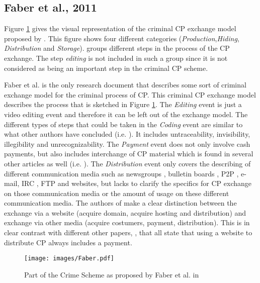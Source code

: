 \documentclass{sig-alternate-br}
\begin{document}
\subsection{Faber et al., 2011 \cite{en2011phishing}}
Figure \ref{fig:faber_01} gives the visual representation of the criminal CP exchange model proposed by \cite{en2011phishing}. This figure shows four different categories (\textit{Production},\textit{Hiding}, \textit{Distribution} and \textit{Storage}). \cite{en2011phishing} groups different steps in the process of the CP exchange. The step \textit{editing} is not included in such a group since it is not considered as being an important step in the criminal CP scheme.

Faber et al. \cite{en2011phishing} is the only research document that describes some sort of criminal exchange model for the criminal process of CP. This criminal CP exchange model \cite{en2011phishing} describes the process that is sketched in Figure \ref{fig:faber_01}. The \textit{Editing} event is just a video editing event and therefore it can be left out of the exchange model. The different types of steps that could be taken in the \textit{Coding} event are similar to what other authors have concluded (i.e. \cite{wortley2006child, jenkins2001beyond,wolak2005child}). It includes untraceability, invisibility, illegibility and unrecognizability. The \textit{Payment} event does not only involve cash payments, but also includes interchange of CP material which is found in several other articles as well (i.e. \cite{wortley2006child,wijk2009achter,wolak2005child}). The \textit{Distribution} event only covers the describing of different communication media such as newsgroups \cite{site:usenet}, bulletin boards \cite{site:bulletin}, P2P \cite{site:p2p}, e-mail, IRC \cite{site:IRC}, FTP \cite{site:FTP} and websites, but lacks to clarify the specifics for CP exchange on those communication media or the amount of usage on these different communication media. The authors of \cite{en2011phishing} make a clear distinction between the exchange via a website (acquire domain, acquire hosting and distribution) and exchange via other media (acquire costumers, payment, distribution). This is in clear contrast with different other papers, \cite{wortley2006child,wijk2009achter,callanan2009internet}, that all state that using a website to distribute CP always includes a payment.

\begin{figure}[ht]
\centering
\texttt{[image: images/Faber.pdf]}
\caption{Part of the Crime Scheme as proposed by Faber et al. in \cite{en2011phishing}}
\label{fig:faber_01}
\end{figure}
\end{document}
